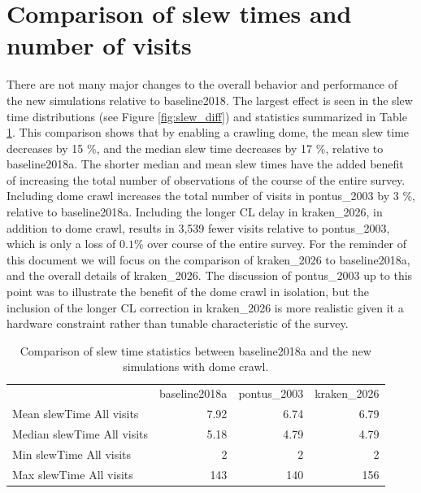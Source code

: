 \documentclass[DM,lsstdraft,authoryear,toc]{lsstdoc}
\begin{document}
\section{Comparison of slew times and number of visits}

There are not many major changes to the overall behavior and performance of the new simulations
relative to baseline2018. The largest effect is seen in the slew time distributions (see Figure \ref{fig:slew_diff}) and statistics summarized in
Table \ref{tab:slewtime-comparison}. This comparison shows that by enabling a crawling dome, the mean
slew time decreases by 15 $\%$, and the median slew time decreases by 17 $\%$, relative to baseline2018a.
The shorter median and mean slew times have the added benefit of increasing the total number of
observations of the course of the entire survey. Including dome crawl increases the total number of visits in
pontus\_2003 by 3 $\%$, relative to baseline2018a. Including the longer CL delay in kraken\_2026, in addition to
dome crawl, results in 3,539 fewer visits relative to pontus\_2003, which is only a loss of $0.1\%$ over course of the
entire survey. For the reminder of this document we will focus on the comparison of kraken\_2026
to baseline2018a, and the overall details of kraken\_2026. The discussion of pontus\_2003 up to this point was to
illustrate the benefit of the dome crawl in isolation, but the inclusion of the longer CL correction in kraken\_2026 is
more realistic given it a hardware constraint rather than tunable characteristic of the survey.

\begin{table}[htp]
\caption{Comparison of slew time statistics between baseline2018a and the new simulations with dome crawl.}
\begin{center}
\small
\begin{tabular}{lrrr}
\toprule
{}                                         &   baseline2018a  &   pontus\_2003  &  kraken\_2026 \\
 Mean slewTime All visits    &           7.92          &         6.74          & 6.79               \\
 Median slewTime All visits &          5.18           &        4.79           & 4.79               \\
 Min slewTime All visits       &           2               &         2               & 2                     \\
 Max slewTime All visits      &         143             &       140             & 156                 \\

\bottomrule
\end{tabular}
\end{center}
\label{tab:slewtime-comparison}
\end{table}
\end{document}
